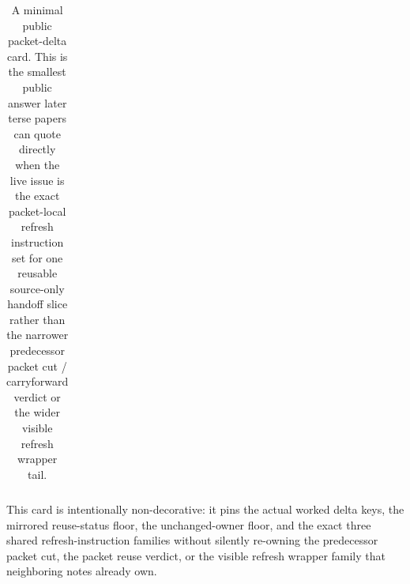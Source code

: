 \documentclass[11pt]{article}
\begin{document}
\begin{table}[t]
\begin{tabularx}{\linewidth}{@{}l X@{}}
\bottomrule
\end{tabularx}
\caption{A minimal public packet-delta card. This is the smallest public answer later terse papers can quote directly when the live issue is the exact packet-local refresh instruction set for one reusable source-only handoff slice rather than the narrower predecessor packet cut / carryforward verdict or the wider visible refresh wrapper tail.}
\label{tab:minimal-public-packet-delta-card}
\end{table}

This card is intentionally non-decorative: it pins the actual worked delta keys, the mirrored reuse-status floor, the unchanged-owner floor, and the exact three shared refresh-instruction families without silently re-owning the predecessor packet cut, the packet reuse verdict, or the visible refresh wrapper family that neighboring notes already own.\cite{series:workedexample}
\end{document}
